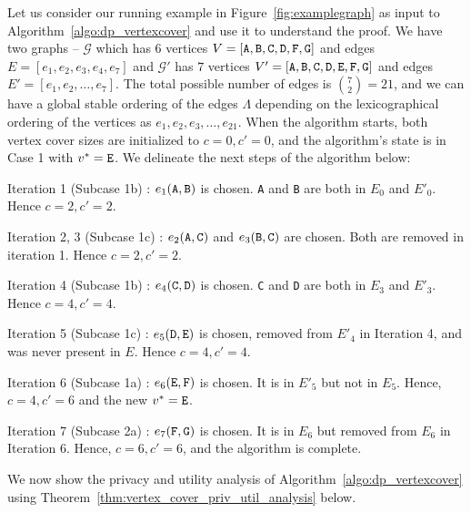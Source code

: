 \begin{example}
    Let us consider our running example in Figure~\ref{fig:examplegraph} as input to Algorithm~\ref{algo:dp_vertexcover} and use it to understand the proof. We have two graphs -- $\mathcal{G}$ which has $6$ vertices $V = [{\tt A, B, C, D, F, G}]$ and edges $E = [e_1, e_2, e_3, e_4, e_7]$ and $\mathcal{G}'$ has $7$ vertices $V' = [{\tt A, B, C, D, E, F, G}]$ and edges $E' = [e_1, e_2, \dots, e_7]$. The total possible number of edges is $\binom{7}{2} = 21$, and we can have a global stable ordering of the edges $\Lambda$ depending on the lexicographical ordering of the vertices as $e_1, e_2, e_3, \dots, e_{21}$. When the algorithm starts, both vertex cover sizes are initialized to $c=0, c'=0$, and the algorithm's state is in Case 1 with $v^* = {\tt E}$. We delineate the next steps of the algorithm below:
    \begin{itemize*}
        \item Iteration 1 (Subcase 1b) : $e_1 ({\tt A,B})$ is chosen. {\tt A} and {\tt B} are both in $E_0$ and $E'_0$. Hence $c = 2, c'= 2$.
        \item Iteration 2, 3 (Subcase 1c) : $e_2 ({\tt A,C})$ and $e_3 ({\tt B,C})$ are chosen. Both are removed in iteration 1. Hence $c = 2, c'= 2$.
        \item Iteration 4 (Subcase 1b) : $e_4 ({\tt C, D})$ is chosen. {\tt C} and {\tt D} are both in $E_3$ and $E'_3$. Hence $c = 4, c'= 4$.
        \item Iteration 5 (Subcase 1c) : $e_5 ({\tt D,E})$ is chosen, removed from $E'_4$ in Iteration 4, and was never present in $E$. Hence $c = 4, c'= 4$.
        \item Iteration 6 (Subcase 1a) : $e_6 ({\tt E, F})$ is chosen. It is in $E'_5$ but not in $E_5$. Hence, $c = 4, c'= 6$ and the new $v^* = {\tt E}$.
        \item Iteration 7 (Subcase 2a) : $e_7 ({\tt F,G})$ is chosen. It is in $E_6$ but removed from $E_6$ in Iteration 6. Hence, $c = 6, c'= 6$, and the algorithm is complete.
    \end{itemize*}
\end{example}





We now show the privacy and utility analysis of Algorithm~\ref{algo:dp_vertexcover} using Theorem~\ref{thm:vertex_cover_priv_util_analysis} below.

\begin{theorem}~\label{thm:vertex_cover_priv_util_analysis}
\end{theorem}

